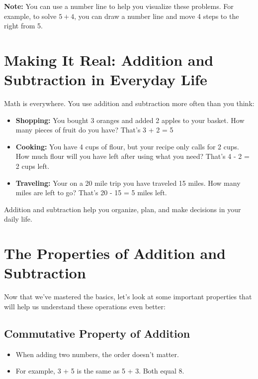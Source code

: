 \textbf{Note:} You can use a number line to help you visualize these problems. For example, to solve $5 + 4$, you can draw a number line and move 4 steps to the right from 5.
\noindent
\begin{center}
    \end{center}

\section{Making It Real: Addition and Subtraction in Everyday Life}
Math is everywhere. You use addition and subtraction more often than you think:
\begin{itemize}
    \item \textbf{Shopping:} You bought 3 oranges and added 2 apples to your basket. How many pieces of fruit do you have? That’s 3 + 2 = 5
    \item \textbf{Cooking:} You have 4 cups of flour, but your recipe only calls for 2 cups. How much flour will you have left after using what you need? That’s 4 - 2 = 2 cups left.
    \item \textbf{Traveling:} Your on a 20 mile trip you have traveled 15 miles. How many miles are left to go? That’s 20 - 15 = 5 miles left.
\end{itemize}

Addition and subtraction help you organize, plan, and make decisions in your daily life.

\section{The Properties of Addition and Subtraction}
Now that we’ve mastered the basics, let’s look at some important properties that will help us understand these operations even better:

\subsection{Commutative Property of Addition}
\begin{itemize}
    \item When adding two numbers, the order doesn’t matter.
    \item For example, 3 + 5 is the same as 5 + 3. Both equal 8.
\end{itemize}

